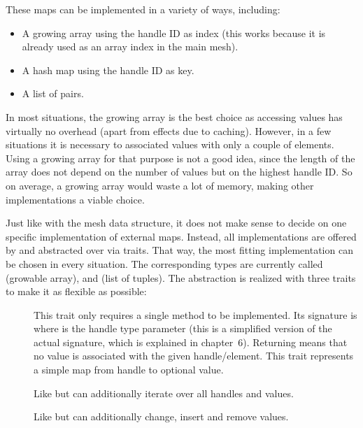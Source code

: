 These maps can be implemented in a variety of ways, including:

\begin{itemize}
\item A growing array using the handle ID as index (this works because it is already used as an array index in the main mesh).
\item A hash map using the handle ID as key.
\item A list of  pairs.
\end{itemize}

In most situations, the growing array is the best choice as accessing values has virtually no overhead (apart from effects due to caching).
However, in a few situations it is necessary to associated values with only a couple of elements.
Using a growing array for that purpose is not a good idea, since the length of the array does not depend on the number of values but on the highest handle ID.
So on average, a growing array would waste a lot of memory, making other implementations a viable choice.

Just like with the mesh data structure, it does not make sense to decide on one specific implementation of external maps.
Instead, all implementations are offered by  and abstracted over via traits.
That way, the most fitting implementation can be chosen in every situation.
The corresponding types are currently called  (growable array),  and  (list of tuples).
The abstraction is realized with three traits to make it as flexible as possible:

\begin{description}
  \item [] This trait only requires a single method to be implemented.
  Its signature is  where  is the handle type parameter (this is a simplified version of the actual signature, which is explained in chapter~6).
  Returning  means that no value is associated with the given handle/element.
  This trait represents a simple map from handle to optional value.
  \item [] Like  but can additionally iterate over all handles and values.
  \item [] Like  but can additionally change, insert and remove values.
\end{description}

